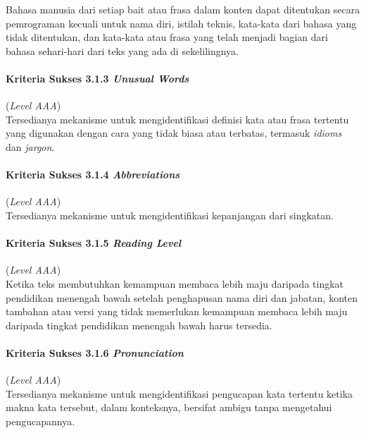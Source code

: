 Bahasa manusia dari setiap bait atau frasa dalam konten dapat ditentukan secara pemrograman kecuali untuk nama diri, istilah teknis, kata-kata dari bahasa yang tidak ditentukan, dan kata-kata atau frasa yang telah menjadi bagian dari bahasa sehari-hari dari teks yang ada di sekelilingnya.

\paragraph{Kriteria Sukses 3.1.3 \textit{Unusual Words}}
\label{subsec:kriteria_3.1.3}
(\textit{Level AAA}) \\

Tersedianya mekanisme untuk mengidentifikasi definisi kata atau frasa tertentu yang digunakan dengan cara yang tidak biasa atau terbatas, termasuk \textit{idioms} dan \textit{jargon}.

\paragraph{Kriteria Sukses 3.1.4 \textit{Abbreviations}}
\label{subsec:kriteria_3.1.4}
(\textit{Level AAA}) \\

Tersedianya mekanisme untuk mengidentifikasi kepanjangan dari singkatan.

\paragraph{Kriteria Sukses 3.1.5 \textit{Reading Level}}
\label{subsec:kriteria_3.1.5}
(\textit{Level AAA}) \\

Ketika teks membutuhkan kemampuan membaca lebih maju daripada tingkat pendidikan menengah bawah setelah penghapusan nama diri dan jabatan, konten tambahan atau versi yang tidak memerlukan kemampuan membaca lebih maju daripada tingkat pendidikan menengah bawah harus tersedia.

\paragraph{Kriteria Sukses 3.1.6 \textit{Pronunciation}}
\label{subsec:kriteria_3.1.6}
(\textit{Level AAA}) \\

Tersedianya mekanisme untuk mengidentifikasi pengucapan kata tertentu ketika makna kata tersebut, dalam konteksnya, bersifat ambigu tanpa mengetahui pengucapannya.

